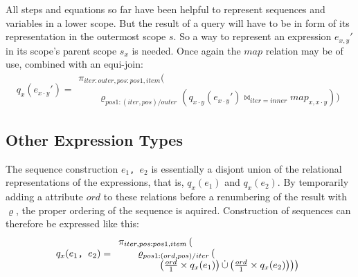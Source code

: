 All steps and equations so far have been helpful to represent sequences and variables in a lower scope. But the
result of a query will have to be in form of its representation in the outermost scope $s$. So a way to represent
an expression $e_{x,y}'$ in its scope's parent scope $s_{x}$ is needed. Once again the $map$ relation may be of
use, combined with an equi-join:
\begin{equation}
q_{x}(e_{x \cdot y}') =
\begin{array}{l}
 \pi_{iter:outer, pos:pos1, item}(\\ \qquad\varrho_{pos1:(iter,pos)/outer}(q_{x \cdot
y}(e_{x \cdot y}')\bowtie_{iter = inner}map_{x, x \cdot y}))
\end{array}
\label{eq:ll:qx_exymark}
\end{equation}


\subsection{Other Expression Types}
\label{sect:trans:ll:OtherExpr}

The sequence construction $e_{1}$\texttt{, }$e_{2}$ is essentially a disjont union of the
relational representations of the expressions, that is, $q_{x}(e_{1})$ and $q_{x}(e_{2})$. By temporarily adding a
attribute $ord$ to these relations before a renumbering of the result with $\varrho$, the proper ordering of the
sequence is aquired. Construction of sequences can therefore be expressed like this:
\begin{equation}
q_{x}(e_{1}\mbox{\texttt{, }}e_{2})=
\begin{array}{l}


\pi_{iter,pos:pos1,item}
\left( \right.\\ \qquad

\varrho_{pos1:(ord,pos)/iter}
	\left( \right. \\ \qquad \qquad
	\left. \left.
		\left(
		\frac{ord}{1} \times q_{x}(e_{1})
		\right)
		\dot\cup
		\left(
		\frac{ord}{1} \times q_{x}(e_{2})
		\right)		
	\right)
\right)
\end{array}
\label{eq:ll:secuence}
\end{equation}

